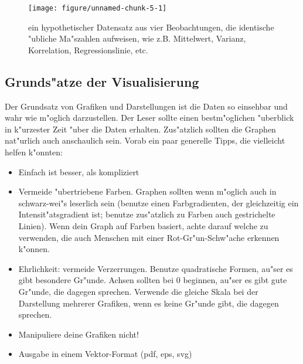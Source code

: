 \documentclass[a4paper,twoside]{tufte-book}\usepackage[]{graphicx}\usepackage[]{color}
\makeatletter
\def\maxwidth{ %
  \ifdim\Gin@nat@width>\linewidth
    \linewidth
  \else
    \Gin@nat@width
  \fi
}
\makeatother
\begin{document}
\begin{figure}[htbp]
\begin{center}
\begin{Schunk}

\texttt{[image: figure/unnamed-chunk-5-1]} \end{Schunk}
\caption{ein hypothetischer Datensatz aus vier Beobachtungen, die identische "ubliche Ma"szahlen aufweisen, wie z.B. Mittelwert, Varianz, Korrelation, Regressionslinie, etc.}
\label{fig: Anscombes Quartet}
\end{center}
\end{figure}


\subsection{Grunds"atze der Visualisierung}

Der Grundsatz von Grafiken und Darstellungen  ist die Daten so einsehbar und wahr wie m"oglich darzustellen. Der Leser sollte einen bestm"oglichen "uberblick in k"urzester Zeit "uber die Daten erhalten. Zus"atzlich sollten die Graphen nat"urlich auch anschaulich sein. Vorab ein paar generelle Tipps, die vielleicht helfen k"onnten:

\begin{itemize}
\item Einfach ist besser, als kompliziert
\item Vermeide "ubertriebene Farben. Graphen sollten wenn m"oglich auch in schwarz-wei"s leserlich sein (benutze einen Farbgradienten, der gleichzeitig ein Intensit"atsgradient ist; benutze zus"atzlich zu Farben auch gestrichelte Linien). Wenn dein Graph auf Farben basiert, achte darauf welche zu verwenden, die auch Menschen mit einer Rot-Gr"un-Schw"ache erkennen k"onnen.
\item Ehrlichkeit: vermeide Verzerrungen. Benutze quadratische Formen, au"ser es gibt besondere Gr"unde. Achsen sollten bei 0 beginnen, au"ser es gibt gute Gr"unde, die dagegen sprechen. Verwende die gleiche Skala bei der Darstellung mehrerer Grafiken, wenn es keine Gr"unde gibt, die dagegen sprechen. 
\item Manipuliere deine Grafiken nicht!
\item Ausgabe in einem Vektor-Format (pdf, eps, svg)
\end{itemize}
\end{document}
